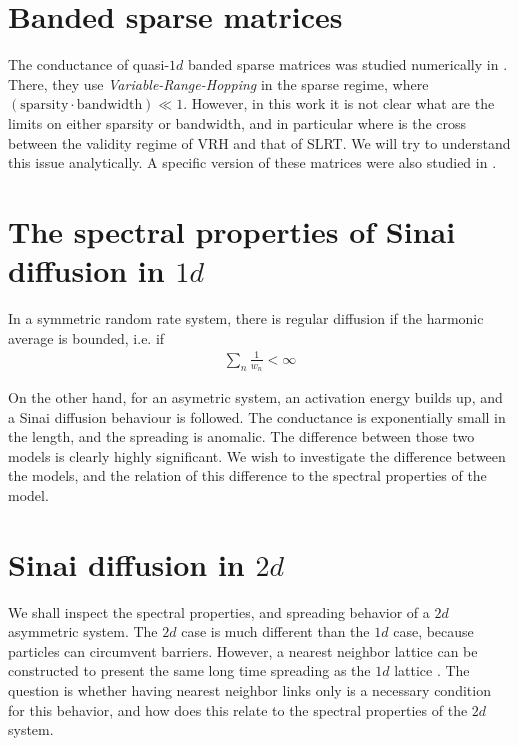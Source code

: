 



\section{Banded sparse matrices}

The conductance of quasi-$1d$ banded sparse matrices was studied numerically in \cite{stotland_random-matrix_2010}. There, they use \emph{Variable-Range-Hopping} in the sparse regime, where 
$(\text{sparsity}\cdot \text{bandwidth}) \ll 1$. However, in this work it is not clear what are the limits on either sparsity or bandwidth, and in particular where is the cross between the validity regime of VRH and that of SLRT. We will try to understand this issue analytically. A specific version of these matrices were also studied in \cite{janssen_correlated_2000}.


\section{The spectral properties of Sinai diffusion in $1d$}

In a symmetric random rate system, there is regular diffusion if the harmonic average is bounded, i.e. if
%
\begin{align}
 \sum_n \frac{1}{w_n} < \infty 
\end{align}
%

On the other hand, for an asymetric system, an activation energy builds up, and a Sinai diffusion behaviour is followed.
The conductance is exponentially small in the length, and the spreading is anomalic. The difference between those two models is clearly highly significant. We wish to investigate the difference between the models, and the relation of this difference to the spectral properties of the model.

\section{Sinai diffusion in $2d$}

We shall inspect the spectral properties, and spreading behavior of a $2d$ asymmetric system. The
$2d$ case is much different than the $1d$ case, because particles can circumvent barriers. However,
a nearest neighbor lattice can be constructed to present the same long time spreading as the $1d$ lattice \cite{blumberg_selinger_diffusion_1989}.
The question is whether having nearest neighbor links only is a necessary condition for this behavior,
and how does this relate to the spectral properties of the $2d$ system.


